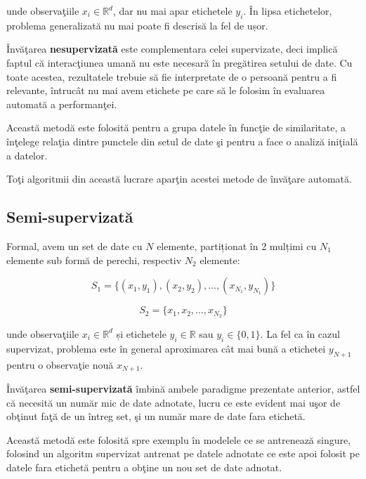unde observaţiile $x_{i} \in \mathbb{R} ^ d$, dar nu mai apar etichetele
$y_{i}$.
În lipsa etichetelor, problema generalizată nu mai poate fi descrisă la fel 
de ușor.

Învăţarea \textbf{nesupervizată} este complementara 
celei supervizate, deci implică faptul 
că interacţiunea umană nu este necesară în pregătirea setului de date. Cu toate 
acestea, rezultatele trebuie să fie interpretate de o persoană pentru a fi relevante,
întrucât nu mai avem etichete pe care să le folosim în evaluarea automată a 
performanţei.

Această metodă este folosită pentru a grupa datele în funcţie de similaritate,
a înţelege relaţia dintre punctele din setul de date şi pentru a face o analiză 
iniţială a datelor.

Toţi algoritmii din această lucrare aparţin acestei metode de învăţare automată.

\subsection{Semi-supervizată}

Formal, avem un set de date cu $N$ elemente, partiționat în 2 mulțimi cu $N_{1}$ elemente sub formă de perechi, 
respectiv $N_{2}$ elemente:

\begin{equation}
    S_{1} = \{(x_{1}, y_{1}), (x_{2}, y_{2}), \dots, (x_{N_{1}}, y_{N_{1}})\}
\end{equation}

\begin{equation}
    S_{2} = \{x_{1}, x_{2}, \dots, x_{N_{2}}\}
\end{equation}

unde observaţiile $x_{i} \in \mathbb{R} ^ d$ și etichetele 
$y_{i} \in \mathbb{R}$ sau $y_{i} \in \{0, 1\}$. 
La fel ca în cazul supervizat, problema este în general
aproximarea cât mai bună a etichetei $y_{N + 1}$ pentru o observaţie nouă 
$x_{N + 1}$.

Învăţarea  \textbf{semi-supervizată} 
îmbină ambele paradigme prezentate anterior, astfel
că necesită un număr mic de date adnotate, lucru ce este evident mai uşor de 
obţinut faţă de un întreg set, şi un număr mare de date fara etichetă.

Această metodă este folosită spre exemplu în modelele ce se antrenează singure, 
folosind un algoritm supervizat antrenat pe datele adnotate ce este apoi 
folosit pe datele fara etichetă pentru a obţine un nou set de date adnotat.

